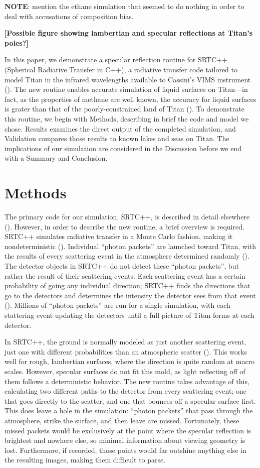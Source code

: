 \documentclass{article}
\begin{document}
\textbf{\color{Purple} NOTE\color{black}}: mention the ethane simulation that seemed to do nothing in order to deal with accusations of composition bias.

\textbf{\color{red} [Possible figure showing lambertian and specular reflections at Titan's poles?] \color{black}}

In this paper, we demonstrate a specular reflection routine for SRTC++ (Spherical Radiative Transfer in C++), a radiative transfer code tailored to model Titan in the infrared wavelengths available to Cassini's VIMS instrument (). The new routine enables accurate simulation of liquid surfaces on Titan---in fact, as the properties of methane are well known, the accuracy for liquid surfaces is grater than that of the poorly-constrained land of Titan (). To demonstrate this routine, we begin with Methods, describing in brief the code and model we chose. Results examines the direct output of the completed simulation, and Validation compares those results to known lakes and seas on Titan. The implications of our simulation are considered in the Discussion before we end with a Summary and Conclusion.

\section{Methods}
The primary code for our simulation, SRTC++, is described in detail elsewhere (). However, in order to describe the new routine, a brief overview is required. SRTC++ simulates radiative transfer in a Monte Carlo fashion, making it nondeterministic (). Individual ``photon packets'' are launched toward Titan, with the results of every scattering event in the atmosphere determined randomly (). The detector objects in SRTC++ do not detect these ``photon packets'', but rather the result of their scattering events. Each scattering event has a certain probability of going any individual direction; SRTC++ finds the directions that go to the detectors and determines the intensity the detector sees from that event (). Millions of ``photon packets'' are run for a single simulation, with each stattering event updating the detectors until a full picture of Titan forms at each detector.

In SRTC++, the ground is normally modeled as just another scattering event, just one with different probabilities than an atmospheric scatter (). This works well for rough, lambertian surfaces, where the direction is quite random at macro scales. However, specular surfaces do not fit this mold, as light reflecting off of them follows a deterministic behavior.  The new routine takes advantage of this, calculating two different paths to the detector from every scattering event; one that goes directly to the scatter, and one that bounces off a specular surface first. This does leave a hole in the simulation: ``photon packets'' that pass through the atmosphere, strike the surface, and then leave are missed. Fortunately, these missed packets would be exclusively at the point where the specular reflection is brightest and nowhere else, so minimal information about viewing geometry is lost. Furthermore, if recorded, those points would far outshine anything else in the resulting images, making them difficult to parse.
\end{document}
